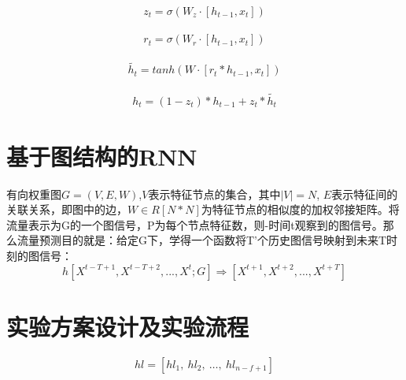   \begin{equation}
    \begin{aligned}
        z_t = \sigma(W_z\cdot [h_{t-1},x_t])
    \end{aligned}
\end{equation}

\begin{equation}
    \begin{aligned}
        r_t = \sigma(W_r\cdot[h_{t-1},x_t])
    \end{aligned}
\end{equation}

\begin{equation}
    \begin{aligned}
        \widetilde {h_t} = tanh(W\cdot[r_t * h_{t-1}, x_t])
    \end{aligned}
\end{equation}

\begin{equation}
    \begin{aligned}
        h_t = (1- z_t) * h_{t-1} + z_t * \widetilde{h_t}
    \end{aligned}
\end{equation}

\section{基于图结构的RNN}
有向权重图$G=(V,E,W)$,$V$表示特征节点的集合，其中$|V|=N$, $E$表示特征间的关联关系，即图中的边，$W∈R[N*N]$为特征节点的相似度的加权邻接矩阵。将流量表示为G的一个图信号，P为每个节点特征数，则-时间t观察到的图信号。那么流量预测目的就是：给定G下，学得一个函数将T'个历史图信号映射到未来T时刻的图信号：
\begin{equation}
    h[X^{t-T+1}, X^{t-T+2},...,X^{t}; G] \Rightarrow [X^{t+1}, X^{t+2}, ..., X^{t+T}]
\end{equation}






\section{实验方案设计及实验流程}
\begin{equation*} hl=[hl_{1},\ hl_{2},\ \ldots,\ hl_{n-f+1}] \tag{-} \end{equation*}

